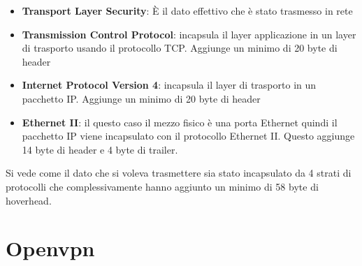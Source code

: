 \begin{itemize}
    \item \textbf{Transport Layer Security}\cite{RFC_8446}: È il dato effettivo che è stato trasmesso in rete  
    
    \item \textbf{Transmission Control Protocol}\cite{RFC_0793}: incapsula il layer applicazione in un layer di trasporto usando il protocollo TCP. Aggiunge un minimo di 20 byte di header 
    
    \item \textbf{Internet Protocol Version 4}\cite{RFC_0791}: incapsula il layer di trasporto in un pacchetto IP. Aggiunge un minimo di 20 byte di header 
    
    \item \textbf{Ethernet II}\cite{ethernet-ii}: il questo caso il mezzo fisico è una porta Ethernet quindi il pacchetto IP viene incapsulato con il protocollo Ethernet II. Questo aggiunge 14 byte di header e 4 byte di trailer.
\end{itemize}

Si vede come il dato che si voleva trasmettere sia stato incapsulato da 4 strati di protocolli che complessivamente hanno aggiunto un minimo di 58 byte di hoverhead.


\section{Openvpn}





